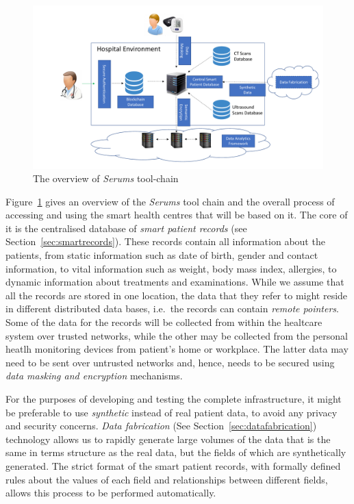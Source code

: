 \begin{figure}
    \includegraphics[scale=0.3]{images/SerumsTools.pdf}
    \caption{The overview of \emph{Serums} tool-chain}
    \label{fig:serumsTools}
\end{figure}

\noindent Figure~\ref{fig:serumsTools} gives an overview of the \emph{Serums} tool chain and the overall process of accessing and using the smart health centres that will be based on it. The core of it is the centralised database of \emph{smart patient records} (see Section~\ref{sec:smartrecords}). These records contain all information about the patients, from static information such as date of birth, gender and contact information, to vital information such as weight, body mass index, allergies, to dynamic information about treatments and examinations. While we assume that all the records are stored in one location, the data that they refer to might reside in different distributed data bases, i.e.~the records can contain \emph{remote pointers}. Some of the data for the records will be collected from within the healtcare system over trusted networks, while the other may be collected from the personal heatlh monitoring devices from patient's home or workplace. The latter data may need to be sent over untrusted networks and, hence, needs to be secured using \emph{data masking and encryption} mechanisms.

For the purposes of developing and testing the complete infrastructure, it might be preferable to use \emph{synthetic} instead of real patient data, to avoid any privacy and security concerns. \emph{Data fabrication} (See Section~\ref{sec:datafabrication}) technology allows us to rapidly generate large volumes of the data that is the same in terms structure as the real data, but the fields of which are synthetically generated. The strict format of the smart patient records, with formally defined rules about the values of each field and relationships between different fields, allows this process to be performed automatically. 


